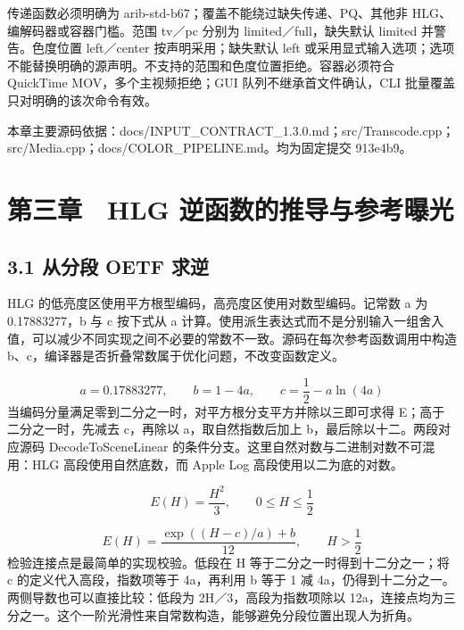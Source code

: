 \documentclass[UTF8,zihao=-4,openany]{ctexbook}
\begin{document}
传递函数必须明确为 arib-std-b67；覆盖不能绕过缺失传递、PQ、其他非 HLG、编解码器或容器门槛。范围 tv／pc 分别为 limited／full，缺失默认 limited 并警告。色度位置 left／center 按声明采用；缺失默认 left 或采用显式输入选项；选项不能替换明确的源声明。不支持的范围和色度位置拒绝。容器必须符合 QuickTime MOV，多个主视频拒绝；GUI 队列不继承首文件确认，CLI 批量覆盖只对明确的该次命令有效。


\par\small 本章主要源码依据：docs/INPUT\_CONTRACT\_1.3.0.md；src/Transcode.cpp；src/Media.cpp；docs/COLOR\_PIPELINE.md。均为固定提交 913e4b9。\normalsize

\chapter*{第三章　HLG 逆函数的推导与参考曝光}

\section*{3.1 从分段 OETF 求逆}
HLG 的低亮度区使用平方根型编码，高亮度区使用对数型编码。记常数 a 为 0.17883277，b 与 c 按下式从 a 计算。使用派生表达式而不是分别输入一组舍入值，可以减少不同实现之间不必要的常数不一致。源码在每次参考函数调用中构造 b、c，编译器是否折叠常数属于优化问题，不改变函数定义。


\begin{equation}
a=0.17883277,\qquad b=1-4a,\qquad c=\frac12-a\ln(4a)
\end{equation}
当编码分量满足零到二分之一时，对平方根分支平方并除以三即可求得 E；高于二分之一时，先减去 c，再除以 a，取自然指数后加上 b，最后除以十二。两段对应源码 DecodeToSceneLinear 的条件分支。这里自然对数与二进制对数不可混用：HLG 高段使用自然底数，而 Apple Log 高段使用以二为底的对数。


\begin{equation}
E(H)=\frac{H^2}{3},\qquad 0\leq H\leq\frac12
\end{equation}

\begin{equation}
E(H)=\frac{\exp((H-c)/a)+b}{12},\qquad H>\frac12
\end{equation}
检验连接点是最简单的实现校验。低段在 H 等于二分之一时得到十二分之一；将 c 的定义代入高段，指数项等于 4a，再利用 b 等于 1 减 4a，仍得到十二分之一。两侧导数也可以直接比较：低段为 2H／3，高段为指数项除以 12a，连接点均为三分之一。这个一阶光滑性来自常数构造，能够避免分段位置出现人为折角。
\end{document}
